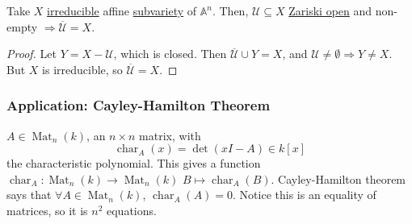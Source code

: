 \documentclass{article}
\newcommand{\A}{\mathbb{A}}
\DeclareMathOperator{\Mat}{Mat}
\DeclareMathOperator{\chara}{char}
\begin{document}
\begin{lemma}
    Take $X$ \hyperlink{def:reducible}{irreducible} affine \hyperlink{def:Z}{subvariety} of \hyperlink{def:affineSpace}{$\A^n$}. Then, $\mathcal{U} \subseteq X$ \hyperlink{def:zariski}{Zariski open} and non-empty $\Rightarrow \overline{\mathcal{U}} = X$.
\end{lemma}
\begin{proof}
    Let $Y = X - \mathcal{U}$, which is closed.
    Then $\overline{\mathcal{U}} \cup Y = X$, and $\mathcal{U} \neq \emptyset \Rightarrow Y \neq X$.
    But $X$ is irreducible, so $\overline{\mathcal{U}} = X$.
\end{proof}
\color{gray}
\subsubsection*{Application: Cayley-Hamilton Theorem}
$A \in \Mat_n(k)$, an $n \times n$ matrix, with
\begin{equation*}
    \chara_A(x) = \det(x I - A) \in k[x]
\end{equation*}
the characteristic polynomial.
This gives a function $\chara_A: \Mat_n(k) \to \Mat_n(k)$ $B \mapsto \chara_A(B)$.
Cayley-Hamilton theorem says that $\forall A \in \Mat_n(k)$, $\chara_A(A) = 0$. Notice this is an equality of matrices, so it is $n^2$ equations.
\end{document}
